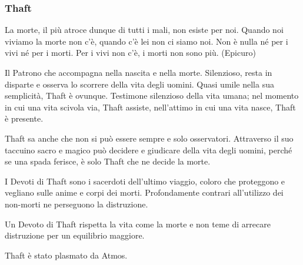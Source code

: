 \begin{multicols}{2}
\subsubsection{Thaft}\label{thaft}\hypertarget{thaft}{}

\begin{enfasi}{
La morte, il più atroce dunque di tutti i mali, non esiste per noi. Quando noi viviamo la morte non c'è, quando c'è lei non ci siamo noi. Non è nulla né per i vivi né per i morti. Per i vivi non c'è, i morti non sono più. (Epicuro)
}\end{enfasi}

Il Patrono che accompagna nella nascita e nella morte. Silenzioso, resta in disparte e osserva lo scorrere della vita degli uomini. Quasi umile nella sua semplicità, Thaft è ovunque. Testimone silenzioso della vita umana; nel momento in cui una vita scivola via, Thaft assiste, nell'attimo in cui una vita nasce, Thaft è presente.

Thaft sa anche che non si può essere sempre e solo osservatori. Attraverso il suo taccuino sacro e magico può decidere e giudicare della vita degli uomini, perché se una spada ferisce, è solo Thaft che ne decide la morte.

I Devoti di Thaft sono i sacerdoti dell'ultimo viaggio, coloro che proteggono e vegliano sulle anime e corpi dei morti. Profondamente contrari all'utilizzo dei non-morti ne perseguono la distruzione.

Un Devoto di Thaft rispetta la vita come la morte e non teme di arrecare distruzione per un equilibrio maggiore.

Thaft è stato plasmato da Atmos.


\end{multicols}
